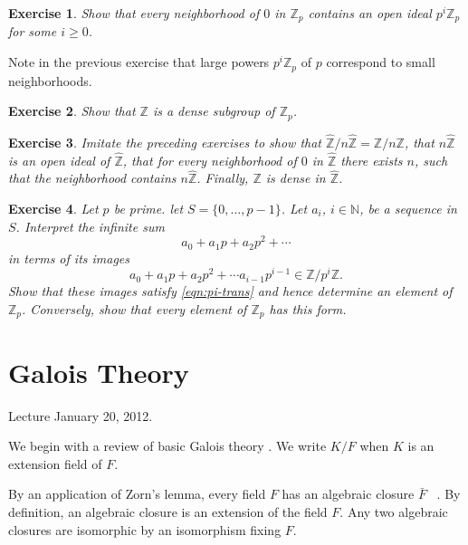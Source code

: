 \documentclass{amsart}
\newcommand{\ring}[1]{\mathbb{#1}}
\newtheorem{exercise}{Exercise}
\begin{document}
\begin{exercise}\label{ex:open-ideal}  
Show that every neighborhood of $0$ in $\ring{Z}_p$ contains
an open ideal $p^i\ring{Z}_p$ for some $i\ge 0$.
\end{exercise}


Note in the previous exercise that large powers $p^i\ring{Z}_p$ of $p$ correspond to
small neighborhoods.


\begin{exercise} Show that $\ring{Z}$ is a dense subgroup of $\ring{Z}_p$. 
\end{exercise}


\begin{exercise} Imitate the preceding exercises to show that
$\hat{\ring{Z}}/n\hat{\ring{Z}} = \ring{Z}/n\ring{Z}$, that $n\hat{\ring{Z}}$
is an open ideal of $\hat{\ring{Z}}$, that for every neighborhood of $0$ in
$\hat{\ring{Z}}$ there exists $n$, such that the
neighborhood contains $n\hat{\ring{Z}}$.  Finally, $\ring{Z}$ is dense
in  $\hat{\ring{Z}}$.
\end{exercise}




\begin{exercise} Let $p$ be prime.  let $S = \{0,\ldots,p-1\}$.
Let $a_i$, $i\in\ring{N}$, be a sequence in $S$.  Interpret the infinite sum
\[
a_0 + a_1 p + a_2 p^2 +\cdots
\]
in terms of its images
\[
a_0 + a_1p + a_2p^2 +\cdots a_{i-1}p^{i-1} \in \ring{Z}/p^i\ring{Z}.
\]
Show that these images satisfy \eqref{eqn:pi-trans} and hence determine an element
of $\ring{Z}_p$.  Conversely, show that every element of $\ring{Z}_p$ has this form.
\end{exercise}



\newpage

\section{Galois Theory}

Lecture January 20, 2012.

We begin with a review of basic Galois theory \cite[Chapter IX]{knapp-basic}.  
We write $K/F$ when $K$ is an extension field of $F$.

By an application of Zorn's lemma, every field $F$ has an algebraic closure
$\bar F$ ~\cite[page 461]{knapp-basic}.  By definition, an algebraic closure
is an extension of the field $F$.
Any two algebraic closures are isomorphic by an isomorphism fixing $F$.
\end{document}
